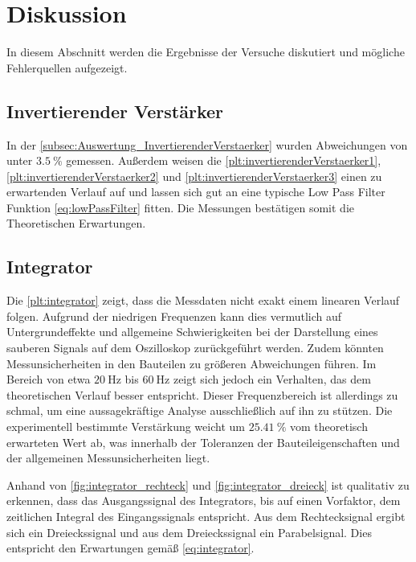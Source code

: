 \section{Diskussion}
\label{sec:Diskussion}

In diesem Abschnitt werden die Ergebnisse der Versuche diskutiert und mögliche Fehlerquellen
aufgezeigt.

\subsection{Invertierender Verstärker}
In der \ref{subsec:Auswertung_InvertierenderVerstaerker} wurden Abweichungen von unter $\qty{3.5}{\percent}$ gemessen. 
Außerdem weisen die \autoref{plt:invertierenderVerstaerker1}, \ref{plt:invertierenderVerstaerker2} und \ref{plt:invertierenderVerstaerker3}  einen 
zu erwartenden Verlauf auf und lassen sich gut an eine typische Low Pass Filter Funktion \ref{eq:lowPassFilter} fitten.
Die Messungen bestätigen somit die Theoretischen Erwartungen.

\subsection{Integrator}
\label{sec:Integrator_Diskussion}
Die \autoref{plt:integrator} zeigt, dass die Messdaten nicht exakt einem linearen Verlauf folgen. 
Aufgrund der niedrigen Frequenzen kann dies vermutlich auf Untergrundeffekte und allgemeine Schwierigkeiten bei der Darstellung eines sauberen Signals auf dem Oszilloskop zurückgeführt werden.
Zudem könnten Messunsicherheiten in den Bauteilen zu größeren Abweichungen führen.
Im Bereich von etwa $\qty{20}{\hertz}$ bis $\qty{60}{\hertz}$ zeigt sich jedoch ein Verhalten, das dem theoretischen Verlauf besser entspricht.
Dieser Frequenzbereich ist allerdings zu schmal, um eine aussagekräftige Analyse ausschließlich auf ihn zu stützen.
Die experimentell bestimmte Verstärkung weicht um $\qty{25.41}{\percent}$ vom theoretisch erwarteten Wert ab, was innerhalb der Toleranzen der Bauteileigenschaften und der allgemeinen Messunsicherheiten liegt.

Anhand von \autoref{fig:integrator_rechteck} und 
\autoref{fig:integrator_dreieck} ist qualitativ zu 
erkennen, dass das Ausgangssignal des Integrators, bis auf einen Vorfaktor, dem zeitlichen Integral 
des Eingangssignals entspricht. Aus dem Rechtecksignal ergibt sich ein Dreieckssignal und aus dem
Dreieckssignal ein Parabelsignal. Dies entspricht den Erwartungen gemäß \autoref{eq:integrator}.

